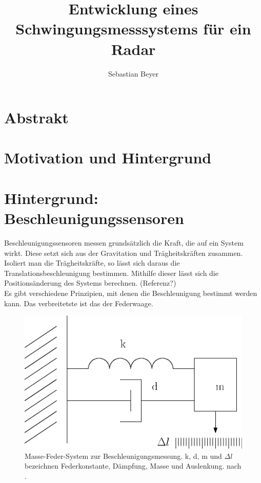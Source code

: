 \documentclass[12pt,a4paper]{scrartcl}
\begin{document}
\title {Entwicklung eines Schwingungsmesssystems für ein Radar}
\author{Sebastian Beyer}
\maketitle

\newpage

\tableofcontents
\newpage


\section{Abstrakt}

\newpage

\section{Motivation und Hintergrund}

\newpage

\section{Hintergrund: Beschleunigungssensoren}

Beschleunigungssensoren messen grundsätzlich die Kraft, die auf ein System wirkt. Diese setzt sich aus der Gravitation und Trägheitskräften zusammen. Isoliert man die Trägheitskräfte, so lässt sich daraus die Translationsbeschleunigung bestimmen. Mithilfe dieser lässt sich die Positionsänderung des Systems berechnen. (Referenz?)\\

Es gibt verschiedene Prinzipien, mit denen die Beschleunigung bestimmt werden kann. Das verbreitetste ist das der Federwaage.

\begin{figure}[H]
\centering
\includegraphics[scale=0.7]{federmasse.eps}
\caption{Masse-Feder-System zur Beschleunigungsmessung. k, d, m und $\Delta l$ bezeichnen Federkonstante, Dämpfung, Masse und Auslenkung. nach \citep{Klingbeil:2006qy}.}
\label{federwaage}
\end{figure}
\end{document}
